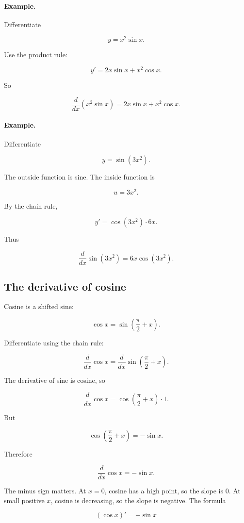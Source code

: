 \paragraph{Example.}
Differentiate

\[
y=x^2\sin x.
\]

Use the product rule:

\[
y'
=
2x\sin x+x^2\cos x.
\]

So

\[
\boxed{
\frac{d}{dx}\left(x^2\sin x\right)
=
2x\sin x+x^2\cos x.
}
\]

\paragraph{Example.}
Differentiate

\[
y=\sin(3x^2).
\]

The outside function is sine.  The inside function is

\[
u=3x^2.
\]

By the chain rule,

\[
y'=\cos(3x^2)\cdot 6x.
\]

Thus

\[
\boxed{
\frac{d}{dx}\sin(3x^2)=6x\cos(3x^2).
}
\]

\subsection{The derivative of cosine}
\label{subsec:derivative-cosine}

Cosine is a shifted sine:

\[
\cos x=\sin\left(\frac{\pi}{2}+x\right).
\]

Differentiate using the chain rule:

\[
\frac{d}{dx}\cos x
=
\frac{d}{dx}\sin\left(\frac{\pi}{2}+x\right).
\]

The derivative of sine is cosine, so

\[
\frac{d}{dx}\cos x
=
\cos\left(\frac{\pi}{2}+x\right)\cdot1.
\]

But

\[
\cos\left(\frac{\pi}{2}+x\right)=-\sin x.
\]

Therefore

\[
\boxed{
\frac{d}{dx}\cos x=-\sin x.
}
\]

The minus sign matters.  At \(x=0\), cosine has a high point, so the slope is \(0\).  At small positive \(x\), cosine is decreasing, so the slope is negative.  The formula

\[
(\cos x)'=-\sin x
\]

